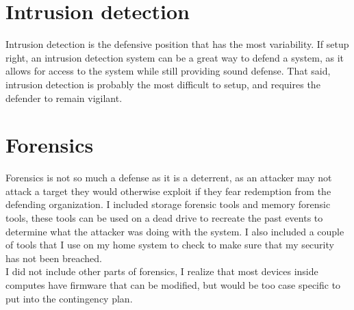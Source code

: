 \documentclass{article}
\begin{document}
\section{Intrusion detection}
Intrusion detection is the defensive position that has the most variability. If setup right, an intrusion detection system can be a great way to defend a system, as it allows for access to the system while still providing sound defense. That said, intrusion detection is probably the most difficult to setup, and requires the defender to remain vigilant.\\

\section{Forensics}
Forensics is not so much a defense as it is a deterrent, as an attacker may not attack a target they would otherwise exploit if they fear redemption from the defending organization. I included storage forensic tools and memory forensic tools, these tools can be used on a dead drive to recreate the past events to determine what the attacker was doing with the system. I also included a couple of tools that I use on my home system to check to make sure that my security has not been breached.\\
I did not include other parts of forensics, I realize that most devices inside computes have firmware that can be modified, but would be too case specific to put into the contingency plan.\\
\end{document}
